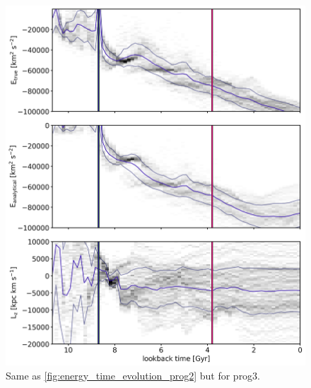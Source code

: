 \iffalse
\begin{figure}
\captionsetup{format=plain}
    \centering
	\includegraphics[width=\textwidth]{plots/Dynamics/prog3/energy_time_evolution_hist_mean.png}
    \caption{Same as \ref{fig:energy_time_evolution_prog2} but for prog3. }\label{fig:energy_time_evolution_prog3}
\end{figure}

